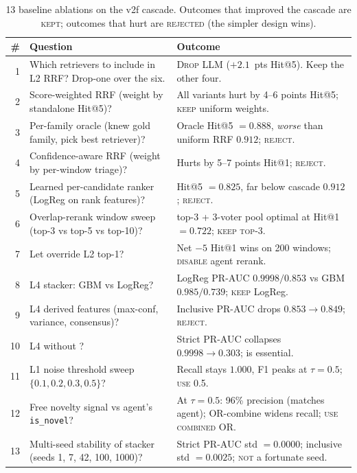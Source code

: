 \begin{table}[h]
\centering
\caption{13 baseline ablations on the v2f cascade. Outcomes that improved the cascade are \textsc{kept}; outcomes that hurt are \textsc{rejected} (the simpler design wins).}
\label{tab:baseline-ablations}
\small
\setlength{\tabcolsep}{4pt}
\renewcommand{\arraystretch}{1.15}
\begin{tabularx}{\linewidth}{@{}r >{\raggedright\arraybackslash}X >{\raggedright\arraybackslash}X@{}}
\toprule
\# & Question & Outcome \\
\midrule
1 & Which retrievers to include in L2 RRF? Drop-one over the six. & \textsc{Drop} \hrrf{} LLM ($+2.1$~pts Hit@5). Keep the other four. \\
2 & Score-weighted RRF (weight by standalone Hit@5)? & All variants hurt by 4--6 points Hit@5; \textsc{keep} uniform weights. \\
3 & Per-family oracle (knew gold family, pick best retriever)? & Oracle Hit@5 $= 0.888$, \emph{worse} than uniform RRF $0.912$; \textsc{reject}. \\
4 & Confidence-aware RRF (weight by per-window triage)? & Hurts by 5--7 points Hit@1; \textsc{reject}. \\
5 & Learned per-candidate ranker (LogReg on rank features)? & Hit@5 $= 0.825$, far below cascade $0.912$; \textsc{reject}. \\
6 & Overlap-rerank window sweep (top-3 vs top-5 vs top-10)? & top-3 + 3-voter pool optimal at Hit@1 $= 0.722$; \textsc{keep top-3}. \\
7 & Let \agent{} override L2 top-1? & Net $-5$ Hit@1 wins on 200 windows; \textsc{disable} agent rerank. \\
8 & L4 stacker: GBM vs LogReg? & LogReg PR-AUC $0.9998 / 0.853$ vs GBM $0.985 / 0.739$; \textsc{keep} LogReg. \\
9 & L4 derived features (max-conf, variance, consensus)? & Inclusive PR-AUC drops $0.853 \to 0.849$; \textsc{reject}. \\
10 & L4 without \hgb{}? & Strict PR-AUC collapses $0.9998 \to 0.303$; \hgb{} is essential. \\
11 & L1 noise threshold sweep $\{0.1, 0.2, 0.3, 0.5\}$? & Recall stays $1.000$, F1 peaks at $\tau = 0.5$; \textsc{use} 0.5. \\
12 & Free novelty signal vs agent's \texttt{is\_novel}? & At $\tau = 0.5$: 96\% precision (matches agent); OR-combine widens recall; \textsc{use combined OR}. \\
13 & Multi-seed stability of stacker (seeds 1, 7, 42, 100, 1000)? & Strict PR-AUC std $= 0.0000$; inclusive std $= 0.0025$; \textsc{not} a fortunate seed. \\
\bottomrule
\end{tabularx}
\end{table}

